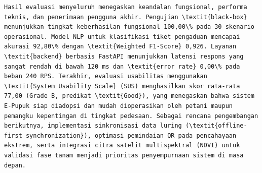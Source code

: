 \documentclass[conference]{IEEEtran}
\begin{document}
\begin{lstlisting}
Hasil evaluasi menyeluruh menegaskan keandalan fungsional, performa teknis, dan penerimaan pengguna akhir. Pengujian \textit{black-box} menunjukkan tingkat keberhasilan fungsional 100,00\% pada 30 skenario operasional. Model NLP untuk klasifikasi tiket pengaduan mencapai akurasi 92,80\% dengan \textit{Weighted F1-Score} 0,926. Layanan \textit{backend} berbasis FastAPI menunjukkan latensi respons yang sangat rendah di bawah 120 ms dan \textit{error rate} 0,00\% pada beban 240 RPS. Terakhir, evaluasi usabilitas menggunakan \textit{System Usability Scale} (SUS) menghasilkan skor rata-rata 77,00 (Grade B, predikat \textit{Good}), yang menegaskan bahwa sistem E-Pupuk siap diadopsi dan mudah dioperasikan oleh petani maupun pemangku kepentingan di tingkat pedesaan. Sebagai rencana pengembangan berikutnya, implementasi sinkronisasi data luring (\textit{offline-first synchronization}), optimasi pemindaian QR pada pencahayaan ekstrem, serta integrasi citra satelit multispektral (NDVI) untuk validasi fase tanam menjadi prioritas penyempurnaan sistem di masa depan.


\end{lstlisting}
\end{document}
